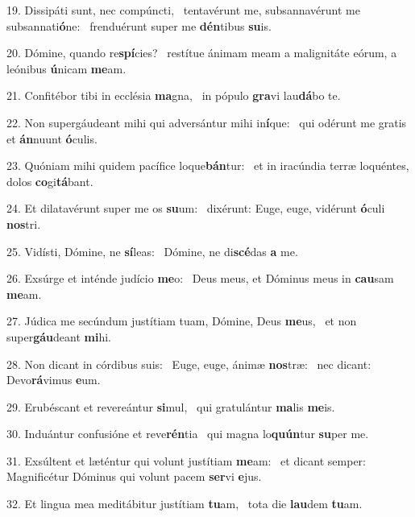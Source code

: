 19. Dissipáti sunt, nec compúncti, \dag\  tentavérunt me, subsannavérunt me subsannati\textbf{ó}ne: \ast\  frenduérunt super me \textbf{dén}tibus \textbf{su}is.\

20. Dómine, quando re\textbf{spí}cies? \ast\  restítue ánimam meam a malignitáte eórum, a leónibus \textbf{ú}nicam \textbf{me}am.\

21. Confitébor tibi in ecclésia \textbf{ma}gna, \ast\  in pópulo \textbf{gra}vi lau\textbf{dá}bo te.\

22. Non supergáudeant mihi qui adversántur mihi in\textbf{í}que: \ast\  qui odérunt me gratis et \textbf{án}nuunt \textbf{ó}culis.\

23. Quóniam mihi quidem pacífice loque\textbf{bán}tur: \ast\  et in iracúndia terræ loquéntes, dolos \textbf{co}gi\textbf{tá}bant.\

24. Et dilatavérunt super me os \textbf{su}um: \ast\  dixérunt: Euge, euge, vidérunt \textbf{ó}culi \textbf{nos}tri.\

25. Vidísti, Dómine, ne \textbf{sí}leas: \ast\  Dómine, ne di\textbf{scé}das \textbf{a} me.\

26. Exsúrge et inténde judício \textbf{me}o: \ast\  Deus meus, et Dóminus meus in \textbf{cau}sam \textbf{me}am.\

27. Júdica me secúndum justítiam tuam, Dómine, Deus \textbf{me}us, \ast\  et non super\textbf{gáu}deant \textbf{mi}hi.\

28. Non dicant in córdibus suis: \dag\  Euge, euge, ánimæ \textbf{nos}træ: \ast\  nec dicant: Devo\textbf{rá}vimus \textbf{e}um.\

29. Erubéscant et revereántur \textbf{si}mul, \ast\  qui gratulántur \textbf{ma}lis \textbf{me}is.\

30. Induántur confusióne et reve\textbf{rén}tia \ast\  qui magna lo\textbf{quún}tur \textbf{su}per me.\

31. Exsúltent et læténtur qui volunt justítiam \textbf{me}am: \ast\  et dicant semper: Magnificétur Dóminus qui volunt pacem \textbf{ser}vi \textbf{e}jus.\

32. Et lingua mea meditábitur justítiam \textbf{tu}am, \ast\  tota die \textbf{lau}dem \textbf{tu}am.\

